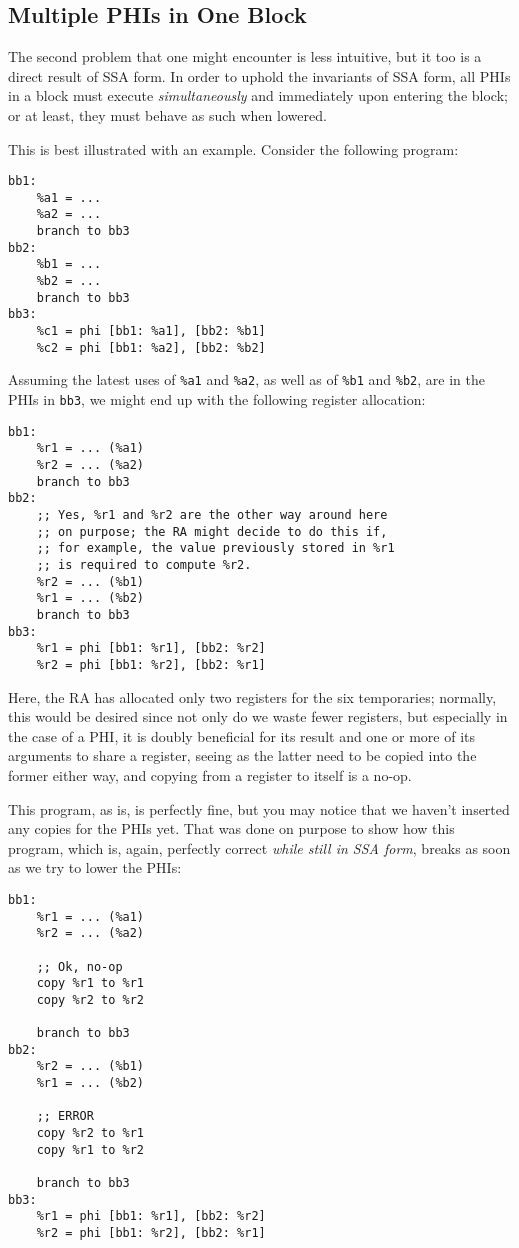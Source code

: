 \documentclass[12pt]{report}
\begin{document}
\subsection{Multiple PHIs in One Block}
The second problem that one might encounter is less intuitive, but it too is a direct result of SSA form. In order to uphold the invariants
of SSA form, all PHIs in a block must execute \textit{simultaneously} and immediately upon entering the block; or at least, they must
behave as such when lowered.

This is best illustrated with an example. Consider the following program:
\begin{Verbatim}
bb1:
    %a1 = ...
    %a2 = ...
    branch to bb3
bb2:
    %b1 = ...
    %b2 = ...
    branch to bb3
bb3:
    %c1 = phi [bb1: %a1], [bb2: %b1]
    %c2 = phi [bb1: %a2], [bb2: %b2]
\end{Verbatim}

\noindent Assuming the latest uses of \verb|%a1| and \verb|%a2|, as well as of \verb|%b1| and \verb|%b2|, are in the PHIs in \verb|bb3|, we
might end up with the following register allocation:
\begin{Verbatim}
bb1:
    %r1 = ... (%a1)
    %r2 = ... (%a2)
    branch to bb3
bb2:
    ;; Yes, %r1 and %r2 are the other way around here
    ;; on purpose; the RA might decide to do this if,
    ;; for example, the value previously stored in %r1
    ;; is required to compute %r2.
    %r2 = ... (%b1)
    %r1 = ... (%b2)
    branch to bb3
bb3:
    %r1 = phi [bb1: %r1], [bb2: %r2]
    %r2 = phi [bb1: %r2], [bb2: %r1]
\end{Verbatim}

\noindent Here, the RA has allocated only two registers for the six temporaries; normally, this would be desired since not only do we waste
fewer registers, but especially in the case of a PHI, it is doubly beneficial for its result and one or more of its arguments to share a
register, seeing as the latter need to be copied into the former either way, and copying from a register to itself is a no-op.

This program, as is, is perfectly fine, but you may notice that we haven't inserted any copies for the PHIs yet. That was done on purpose
to show how this program, which is, again, perfectly correct \textit{while still in SSA form}, breaks as soon as we try to lower the PHIs:
\begin{Verbatim}
bb1:
    %r1 = ... (%a1)
    %r2 = ... (%a2)

    ;; Ok, no-op
    copy %r1 to %r1
    copy %r2 to %r2

    branch to bb3
bb2:
    %r2 = ... (%b1)
    %r1 = ... (%b2)

    ;; ERROR
    copy %r2 to %r1
    copy %r1 to %r2

    branch to bb3
bb3:
    %r1 = phi [bb1: %r1], [bb2: %r2]
    %r2 = phi [bb1: %r2], [bb2: %r1]
\end{Verbatim}
\end{document}
